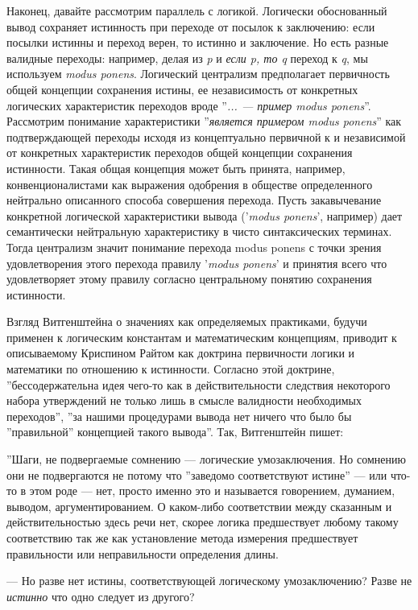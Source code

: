 \documentclass[11pt]{book}
\begin{document}
Наконец, давайте рассмотрим параллель с логикой. Логически обоснованный вывод сохраняет истинность при переходе от посылок к заключению: если посылки истинны и переход верен, то истинно и заключение. Но есть разные валидные переходы: например, делая из \textit{p} и \textit{если p, то q} переход к \textit{q}, мы используем \textit{modus ponens}. Логический централизм предполагает первичность общей концепции сохранения истины, ее независимость от конкретных логических характеристик переходов вроде ''\textit{... --- пример modus ponens}''. Рассмотрим понимание характеристики ''\textit{является примером modus ponens}'' как подтверждающей переходы исходя из концептуально первичной к и независимой от конкретных характеристик переходов общей концепции сохранения истинности. Такая общая концепция может быть принята, например, конвенционалистами как выражения одобрения в обществе определенного нейтрально описанного способа совершения перехода. Пусть закавычевание конкретной логической характеристики вывода ('\textit{modus ponens}', например) дает семантически нейтральную характеристику в чисто синтаксических терминах. Тогда централизм значит понимание перехода modus ponens с точки зрения удовлетворения этого перехода правилу '\textit{modus ponens}' и принятия всего что удовлетворяет этому правилу согласно центральному понятию сохранения истинности.

Взгляд Витгенштейна о значениях как определяемых практиками, будучи применен к логическим константам и математическим концепциям, приводит к описываемому Криспином Райтом как доктрина первичности логики и математики по отношению к истинности. Согласно этой доктрине, ''бессодержательна идея чего-то как в действительности следствия некоторого набора утверждений не только лишь в смысле валидности необходимых переходов'', ''за нашими процедурами вывода нет ничего что было бы ''правильной'' концепцией такого вывода''. Так, Витгенштейн пишет:

\smallskip

''Шаги, не подвергаемые сомнению --- логические умозаключения. Но сомнению они не подвергаются не потому что ''заведомо соответствуют истине'' --- или что-то в этом роде --- нет, просто именно это и называется говорением, думанием, выводом, аргументированием. О каком-либо соответствии между сказанным и действительностью здесь речи нет, скорее логика предшествует любому такому соответствию так же как установление метода измерения предшествует правильности или неправильности определения длины.

--- Но разве нет истины, соответствующей логическому умозаключению? Разве не \textit{истинно} что одно следует из другого?
\end{document}
